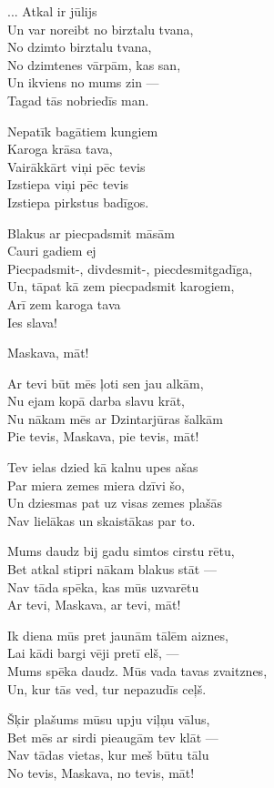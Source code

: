 \documentclass[14pt]{extarticle}
\begin{document}
{... Atkal ir jūlijs\\
Un var noreibt no birztalu tvana,\\
No dzimto birztalu tvana,\\
No dzimtenes vārpām, kas san,\\
Un ikviens no mums zin ---\\
Tagad tās nobriedīs man.

Nepatīk bagātiem kungiem\\
Karoga krāsa tava,\\
Vairākkārt viņi pēc tevis\\
Izstiepa viņi pēc tevis\\
Izstiepa pirkstus badīgos.

Blakus ar piecpadsmit māsām\\
Cauri gadiem ej\\
Piecpadsmit-, divdesmit-, piecdesmitgadīga,\\
Un, tāpat kā zem piecpadsmit karogiem,\\
Arī zem karoga tava\\
Ies slava!

\newpage

{\large \sc Maskava, māt!}

Ar tevi būt mēs ļoti sen jau alkām,\\
Nu ejam kopā darba slavu krāt,\\
Nu nākam mēs ar Dzintarjūras šalkām\\
Pie tevis, Maskava, pie tevis, māt!

Tev ielas dzied kā kalnu upes ašas\\
Par miera zemes miera dzīvi šo,\\
Un dziesmas pat uz visas zemes plašās\\
Nav lielākas un skaistākas par to.

Mums daudz bij gadu simtos cirstu rētu,\\
Bet atkal stipri nākam blakus stāt ---\\
Nav tāda spēka, kas mūs uzvarētu\\
Ar tevi, Maskava, ar tevi, māt!

Ik diena mūs pret jaunām tālēm aiznes,\\
Lai kādi bargi vēji pretī elš, ---\\
Mums spēka daudz. Mūs vada tavas zvaitznes,\\
Un, kur tās ved, tur nepazudīs ceļš.

Šķir plašums mūsu upju viļņu vālus,\\
Bet mēs ar sirdi pieaugām tev klāt ---\\
Nav tādas vietas, kur meš būtu tālu\\
No tevis, Maskava, no tevis, māt!

}
\end{document}
